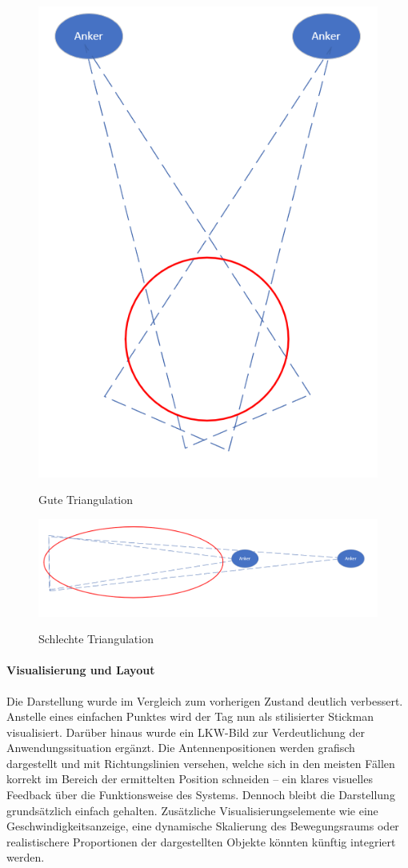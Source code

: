 \documentclass[a4paper, 12pt]{article} %
\begin{document}
\begin{figure}[H]
    \includegraphics[width=0.5\linewidth]{images/Gute Triangulation.png}\\[1ex]
    \centering
    \caption{Gute Triangulation}
    \label{ABBILDUNG}
\end{figure}
\begin{figure}[H]
    \includegraphics[width=1\linewidth]{images/Schlechte Triangulation.png}\\[1ex]
    \centering
    \caption{Schlechte Triangulation}
    \label{ABBILDUNG}
\end{figure}


\paragraph{Visualisierung und Layout}
Die Darstellung wurde im Vergleich zum vorherigen Zustand deutlich verbessert. Anstelle eines einfachen Punktes wird der Tag nun als stilisierter 
Stickman visualisiert. Darüber hinaus wurde ein \ac{LKW}-Bild zur Verdeutlichung der Anwendungssituation ergänzt. Die Antennenpositionen werden 
grafisch dargestellt und mit Richtungslinien versehen, welche sich in den meisten Fällen korrekt im Bereich der ermittelten Position schneiden – ein 
klares visuelles Feedback über die Funktionsweise des Systems. Dennoch bleibt die Darstellung grundsätzlich einfach gehalten. Zusätzliche 
Visualisierungselemente wie eine Geschwindigkeitsanzeige, eine dynamische Skalierung des Bewegungsraums oder realistischere Proportionen der 
dargestellten Objekte könnten künftig integriert werden.
\end{document}
